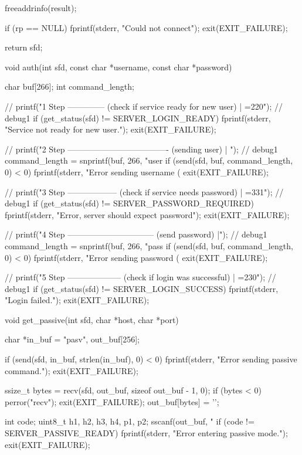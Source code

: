 \documentclass[11pt,a4paper]{article}
\begin{document}
\begin{c-darktheme}
{    freeaddrinfo(result);

    if (rp == NULL)
    {
        fprintf(stderr, "Could not connect\n");
        exit(EXIT_FAILURE);
    }

    return sfd;
}

void auth(int sfd, const char *username, const char *password)
{
    char buf[266];
    int command_length;

    // printf("1 Step -------------- (check if service ready for new user) | =220\n"); // debug1
    if (get_status(sfd) != SERVER_LOGIN_READY)
    {
        fprintf(stderr, "Service not ready for new user.\n");
        exit(EXIT_FAILURE);
    }

    // printf("2 Step ------------------------------------- (sending user) | \n"); // debug1
    command_length = snprintf(buf, 266, "user %
    if (send(sfd, buf, command_length, 0) < 0)
    {
        fprintf(stderr, "Error sending username (%
        exit(EXIT_FAILURE);
    }

    // printf("3 Step ------------------ (check if service needs password) | =331\n"); // debug1
    if (get_status(sfd) != SERVER_PASSWORD_REQUIRED)
    {
        fprintf(stderr, "Error, server should expect password\n");
        exit(EXIT_FAILURE);
    }

    // printf("4 Step -------------------------------- (send password) |\n"); // debug1
    command_length = snprintf(buf, 266, "pass %
    if (send(sfd, buf, command_length, 0) < 0)
    {
        fprintf(stderr, "Error sending password (%
        exit(EXIT_FAILURE);
    }

    // printf("5 Step -------------------- (check if login was successful) | =230\n"); // debug1
    if (get_status(sfd) != SERVER_LOGIN_SUCCESS)
    {
        fprintf(stderr, "Login failed.\n");
        exit(EXIT_FAILURE);
    }
}

void get_passive(int sfd, char *host, char *port)
{
    char *in_buf = "pasv\n", out_buf[256];

    if (send(sfd, in_buf, strlen(in_buf), 0) < 0)
    {
        fprintf(stderr, "Error sending passive command.\n");
        exit(EXIT_FAILURE);
    }

    ssize_t bytes = recv(sfd, out_buf, sizeof out_buf - 1, 0);
    if (bytes < 0)
    {
        perror("recv");
        exit(EXIT_FAILURE);
    }
    out_buf[bytes] = '\0';

    int code;
    uint8_t h1, h2, h3, h4, p1, p2;
    sscanf(out_buf, "%
    if (code != SERVER_PASSIVE_READY)
    {
        fprintf(stderr, "Error entering passive mode.\n");
        exit(EXIT_FAILURE);
    }

}
\end{c-darktheme}
\end{document}
